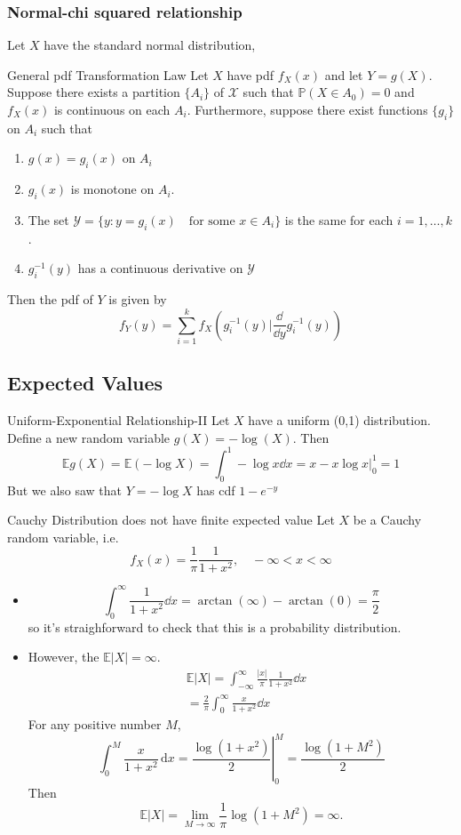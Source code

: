 \documentclass[../main]{subfiles}
\begin{document}
\subsubsection{Normal-chi squared relationship}
Let $X$ have the standard normal distribution,
\begin{bbox}{General pdf Transformation Law}
    Let $X$ have pdf $f_X(x)$ and let $Y=g(X)$. Suppose there exists a partition $\{A_i\}$ of $\mathcal X$ such that $\mathbb P(X\in A_0) = 0$ and $f_X(x)$ is continuous on each $A_i$. Furthermore, suppose there exist functions $\{g_i\}$ on $A_i$ such that 
    \begin{enumerate}
        \item $g(x) = g_i(x)$ on $A_i$
        \item $g_i(x)$ is monotone on $A_i$.
        \item The set $\mathcal Y = \{y: y=g_i(x) \quad  \text{for some $x\in A_i$}\}$ is the same for each $i=1,\dots,k$.
        \item $g_i^{-1}(y)$ has a continuous derivative on $\mathcal Y$
    \end{enumerate}
    Then the pdf of $Y$ is given by 
    \[
    f_Y(y) = \sum_{i=1}^k f_X(g_i^{-1}(y)|\frac{\dd}{\dd y}g_i^{-1}(y))
    \]
\end{bbox}

\subsection{Expected Values}
\begin{pbox}{Uniform-Exponential Relationship-II}
    Let $X$ have a uniform (0,1) distribution. Define a new random variable $g(X) = -\log(X)$. Then
    \[
    \mathbb E g(X) = \mathbb E(-\log X) = \int_{0}^{1}-\log x \dd x= x - x\log x|_{0}^{1} = 1
    \]
    But we also saw that $Y=-\log X$ has cdf $1-e^{-y}$
\end{pbox}
\begin{pbox}{Cauchy Distribution does not have finite expected value}
    Let $X$ be a Cauchy random variable, i.e. 
    \[
    f_X(x) = \frac{1}{\pi}\frac{1}{1+x^2}, \quad -\infty < x < \infty
    \]
    \begin{itemize}
        \item \[
        \int_{0}^{\infty}\frac{1}{1+x^2}\dd x =\arctan(\infty)-\arctan(0) = \frac{\pi}{2}
        \]
        so it's straighforward to check that this is a probability distribution.
        \item However, the $\mathbb E|X| = \infty$.
        \begin{align*}
            &\mathbb E|X| = \int_{-\infty}^\infty \frac{|x|}{\pi}\frac{1}{1+x^2}\dd x\\
            &=\frac{2}{\pi}\int_0^\infty \frac{x}{1+x^2}\dd x
        \end{align*}
        For any positive number $M$,
        \[
        \int_{0}^{M} \frac{x}{1+x^{2}} \, \mathrm{d}x 
        = \left. \frac{\log(1+x^{2})}{2} \right|_{0}^{M} = \frac{\log(1+M^2)}{2}
        \]
        Then 
        \[
        \mathbb E|X| = \lim_{M\to\infty}\frac{1}{\pi}\log(1+M^2) = \infty.
        \]
    \end{itemize}
\end{pbox}
\end{document}

